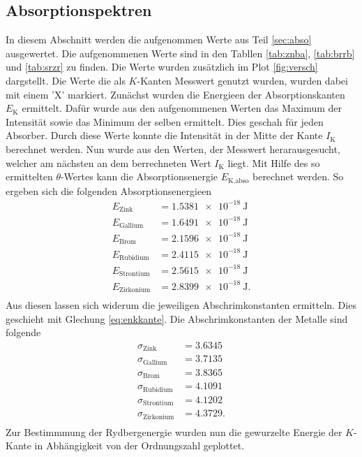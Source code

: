\subsection{Absorptionspektren}
In diesem Abschnitt werden die aufgenommen Werte aus Teil \ref{sec:abso} ausgewertet.
Die aufgenommenen Werte sind in den Tabllen \ref{tab:znba}, \ref{tab:brrb} und \ref{tab:srzr} zu finden.
Die Werte wurden zusätzlich im Plot \ref{fig:versch} dargstellt.
Die Werte die als $K$-Kanten Messwert genutzt wurden, wurden dabei mit einem 'X' markiert.
Zunächst wurden die Energieen der Absorptionskanten $E_\text{K}$ ermittelt.
Dafür wurde aus den aufgenommenen Werten das Maximum der Intensität sowie das Minimum der selben ermittelt.
Dies geschah für jeden Absorber.
Durch diese Werte konnte die Intensität in der Mitte der Kante $I_\text{K}$ berechnet werden.
Nun wurde aus den Werten, der Messwert herarausgesucht, welcher am nächsten an dem berrechneten Wert $I_\text{K}$ liegt.
Mit Hilfe des so ermittelten $\theta$-Wertes kann die Absorptionsenergie $E_\text{K,abso}$ berechnet werden.
So ergeben sich die folgenden Absorptionsenergieen
\begin{align*}
E_\text{Zink} & = \SI{1.5381e-18}{\J} \\
E_\text{Gallium} & = \SI{1.6491e-18 }{\J}\\
E_\text{Brom} & = \SI{2.1596e-18 }{\J} \\
E_\text{Rubidium} & = \SI{2.4115e-18}{\J} \\
E_\text{Strontium} & = \SI{2.5615e-18}{\J}  \\
E_\text{Zirkonium} & = \SI{2.8399e-18}{\J}.  \\
\end{align*}
Aus diesen lassen sich widerum die jeweiligen Abschrimkonstanten ermitteln.
Dies geschieht mit Glechung \eqref{eq:enkkante}.
Die Abschrimkonstanten der Metalle sind folgende
\begin{align*}
  \sigma_\text{Zink} & = 3.6345   \\
  \sigma_\text{Gallium} & = 3.7135 \\
  \sigma_\text{Brom} & = 3.8365 \\
  \sigma_\text{Rubidium} & = 4.1091 \\
  \sigma_\text{Strontium} & = 4.1202\\ 
  \sigma_\text{Zirkonium} & = 4.3729.\\
\end{align*}
Zur Bestimmmung der Rydbergenergie wurden nun die gewurzelte Energie der $K$-Kante in Abhängigkeit von der Ordnungszahl geplottet.
